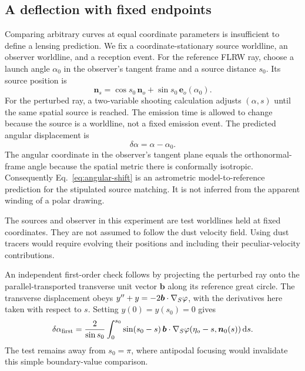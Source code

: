 \subsection{A deflection with fixed endpoints}
Comparing arbitrary curves at equal coordinate parameters is insufficient
to define a lensing prediction. We fix a coordinate-stationary source
worldline, an observer worldline, and a reception event. For the reference
FLRW ray, choose a launch angle $\alpha_0$ in the observer's tangent frame
and a source distance $s_0$. Its source position is
\begin{equation}
 \bm n_s=\cos s_0\,\bm n_o+\sin s_0\,\bm e_o(\alpha_0).
\end{equation}
For the perturbed ray, a two-variable shooting calculation adjusts
$(\alpha,s)$ until the same spatial source is reached. The emission time
is allowed to change because the source is a worldline, not a fixed
emission event. The predicted angular displacement is
\begin{equation}\label{eq:angular-shift}
 \delta\alpha=\alpha-\alpha_0.
\end{equation}
The angular coordinate in the observer's tangent plane equals the
orthonormal-frame angle because the spatial metric there is conformally
isotropic. Consequently Eq.~\eqref{eq:angular-shift} is an astrometric
model-to-reference prediction for the stipulated source matching. It is
not inferred from the apparent winding of a polar drawing.

The sources and observer in this experiment are test worldlines held at
fixed coordinates. They are not assumed to follow the dust velocity
field. Using dust tracers would require evolving their positions and
including their peculiar-velocity contributions.

An independent first-order check follows by projecting the perturbed ray
onto the parallel-transported transverse unit vector $\bm b$ along its
reference great circle. The transverse displacement obeys
$y''+y=-2\bm b\cdot\nabla_S\varphi$, with the derivatives here taken
with respect to $s$. Setting $y(0)=y(s_0)=0$ gives
\begin{equation}\label{eq:born-angle}
 \delta\alpha_{\mathrm{first}}=\frac{2}{\sin s_0}
 \int_0^{s_0}\sin(s_0-s)\,
 \bm b\cdot\nabla_S\varphi(\eta_o-s,\bm n_0(s))\,\mathrm{d} s.
\end{equation}
The test remains away from $s_0=\pi$, where antipodal focusing would
invalidate this simple boundary-value comparison.

